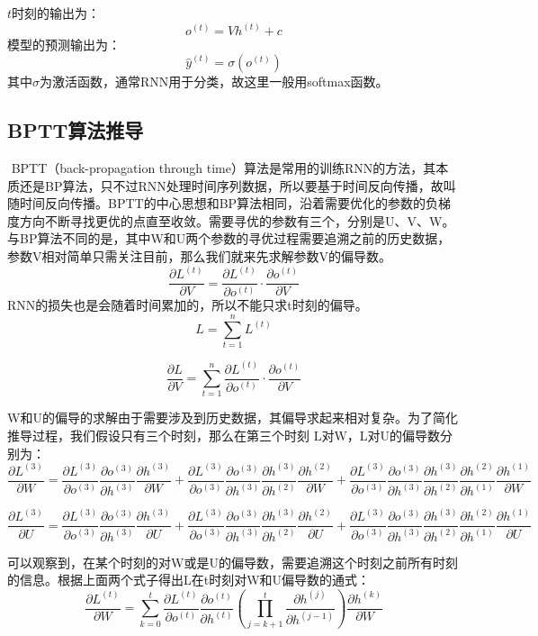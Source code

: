 \(t\)时刻的输出为： \[
o^{(t)}=Vh^{(t)}+c
\] 模型的预测输出为： \[
\widehat{y}^{(t)}=\sigma(o^{(t)})
\] 其中\(\sigma​\)为激活函数，通常RNN用于分类，故这里一般用softmax函数。

\subsection{ BPTT算法推导}\label{bpttux7b97ux6cd5ux63a8ux5bfc}

​ BPTT（back-propagation through
time）算法是常用的训练RNN的方法，其本质还是BP算法，只不过RNN处理时间序列数据，所以要基于时间反向传播，故叫随时间反向传播。BPTT的中心思想和BP算法相同，沿着需要优化的参数的负梯度方向不断寻找更优的点直至收敛。需要寻优的参数有三个，分别是U、V、W。与BP算法不同的是，其中W和U两个参数的寻优过程需要追溯之前的历史数据，参数V相对简单只需关注目前，那么我们就来先求解参数V的偏导数。
\[
\frac{\partial L^{(t)}}{\partial V}=\frac{\partial L^{(t)}}{\partial o^{(t)}}\cdot \frac{\partial o^{(t)}}{\partial V}
\] RNN的损失也是会随着时间累加的，所以不能只求t时刻的偏导。 \[
L=\sum_{t=1}^{n}L^{(t)}
\]

\[
\frac{\partial L}{\partial V}=\sum_{t=1}^{n}\frac{\partial L^{(t)}}{\partial o^{(t)}}\cdot \frac{\partial o^{(t)}}{\partial V}
\]

​
W和U的偏导的求解由于需要涉及到历史数据，其偏导求起来相对复杂。为了简化推导过程，我们假设只有三个时刻，那么在第三个时刻
L对W，L对U的偏导数分别为： \[
\frac{\partial L^{(3)}}{\partial W}=\frac{\partial L^{(3)}}{\partial o^{(3)}}\frac{\partial o^{(3)}}{\partial h^{(3)}}\frac{\partial h^{(3)}}{\partial W}+\frac{\partial L^{(3)}}{\partial o^{(3)}}\frac{\partial o^{(3)}}{\partial h^{(3)}}\frac{\partial h^{(3)}}{\partial h^{(2)}}\frac{\partial h^{(2)}}{\partial W}+\frac{\partial L^{(3)}}{\partial o^{(3)}}\frac{\partial o^{(3)}}{\partial h^{(3)}}\frac{\partial h^{(3)}}{\partial h^{(2)}}\frac{\partial h^{(2)}}{\partial h^{(1)}}\frac{\partial h^{(1)}}{\partial W}
\]

\[
\frac{\partial L^{(3)}}{\partial U}=\frac{\partial L^{(3)}}{\partial o^{(3)}}\frac{\partial o^{(3)}}{\partial h^{(3)}}\frac{\partial h^{(3)}}{\partial U}+\frac{\partial L^{(3)}}{\partial o^{(3)}}\frac{\partial o^{(3)}}{\partial h^{(3)}}\frac{\partial h^{(3)}}{\partial h^{(2)}}\frac{\partial h^{(2)}}{\partial U}+\frac{\partial L^{(3)}}{\partial o^{(3)}}\frac{\partial o^{(3)}}{\partial h^{(3)}}\frac{\partial h^{(3)}}{\partial h^{(2)}}\frac{\partial h^{(2)}}{\partial h^{(1)}}\frac{\partial h^{(1)}}{\partial U}
\]

可以观察到，在某个时刻的对W或是U的偏导数，需要追溯这个时刻之前所有时刻的信息。根据上面两个式子得出L在t时刻对W和U偏导数的通式：
\[
\frac{\partial L^{(t)}}{\partial W}=\sum_{k=0}^{t}\frac{\partial L^{(t)}}{\partial o^{(t)}}\frac{\partial o^{(t)}}{\partial h^{(t)}}(\prod_{j=k+1}^{t}\frac{\partial h^{(j)}}{\partial h^{(j-1)}})\frac{\partial h^{(k)}}{\partial W}
\]

